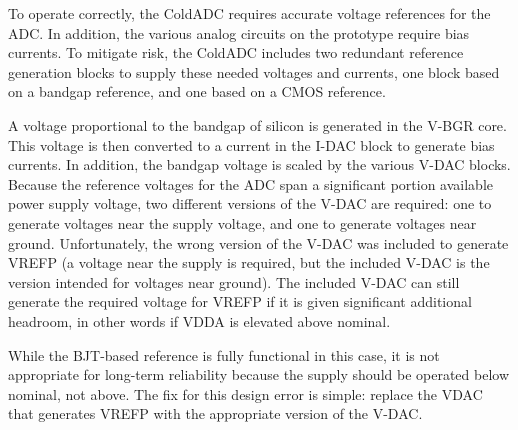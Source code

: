 \label{sec:5.8}

To operate correctly, the ColdADC requires accurate voltage references for the ADC. In addition, the various analog circuits on the prototype require bias currents. To mitigate risk, the ColdADC includes two redundant reference generation blocks to supply these needed voltages and currents, one block based on a bandgap reference, and one based on a CMOS reference. 

A voltage proportional to the bandgap of silicon is generated in the V-BGR core. This voltage is then converted to a current in the I-DAC block to generate bias currents. In addition, the bandgap voltage is scaled by the various V-DAC blocks. Because the reference voltages for the ADC span a significant portion available power supply voltage, two different versions of the V-DAC are required: one to generate voltages near the supply voltage, and one to generate voltages near ground. Unfortunately, the wrong version of the V-DAC was included to generate VREFP (a voltage near the supply is required, but the included V-DAC is the version intended for voltages near ground). The included V-DAC can still generate the required voltage for VREFP if it is given significant additional headroom, in other words if VDDA is elevated above nominal.

While the BJT-based reference is fully functional in this case, it is not appropriate for long-term reliability because the supply should be operated below nominal, not above. The fix for this design error is simple: replace the VDAC that generates VREFP with the appropriate version of the V-DAC.

